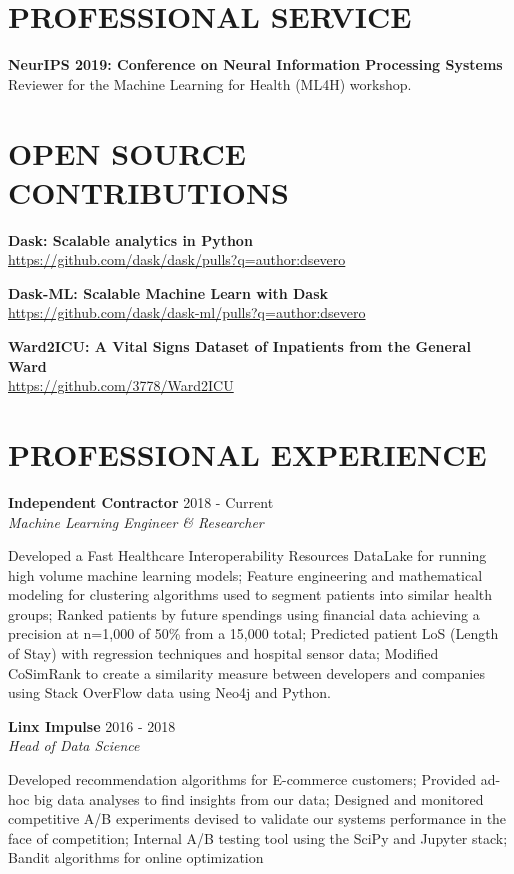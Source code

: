 \documentclass[margin, line]{res}
\begin{document}
\begin{resume}
\section{PROFESSIONAL SERVICE}
\textbf{NeurIPS 2019: Conference on Neural Information Processing Systems}\\
Reviewer for the Machine Learning for Health (ML4H) workshop.

\section{OPEN SOURCE CONTRIBUTIONS}
\textbf{Dask: Scalable analytics in Python}\\
\url{https://github.com/dask/dask/pulls?q=author:dsevero}

\textbf{Dask-ML: Scalable Machine Learn with Dask}\\
\url{https://github.com/dask/dask-ml/pulls?q=author:dsevero}

\textbf{Ward2ICU: A Vital Signs Dataset of Inpatients from the General Ward}\\
\url{https://github.com/3778/Ward2ICU}

\section{PROFESSIONAL EXPERIENCE}
\textbf{Independent Contractor} \hfill 2018 - Current\\
{\sl Machine Learning Engineer \& Researcher}\\
\begin{small}
    Developed a Fast Healthcare Interoperability Resources DataLake for running high volume machine learning models; Feature engineering and mathematical modeling for clustering algorithms used to segment patients into similar health groups; Ranked patients by future spendings using financial data achieving a precision at n=1,000 of 50\% from a 15,000 total; Predicted patient LoS (Length of Stay) with regression techniques and hospital sensor data; Modified CoSimRank to create a similarity measure between developers and companies using Stack OverFlow data using Neo4j and Python.
\end{small}

\textbf{Linx Impulse} \hfill 2016 - 2018\\
{\sl Head of Data Science}\\
\begin{small}
    Developed recommendation algorithms for E-commerce customers; Provided ad-hoc big data analyses to find insights from our data; Designed and monitored competitive A/B experiments devised to validate our systems performance in the face of competition; Internal A/B testing tool using the SciPy and Jupyter stack; Bandit algorithms for online optimization
\end{small}


\end{resume}
\end{document}
